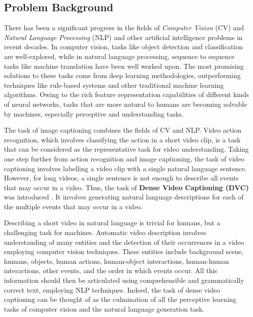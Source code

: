 \subsection{Problem Background}

\par There has been a significant progress in the fields of \textit{Computer Vision} (CV) and \textit{Natural Language Processing} (NLP) and other artificial intelligence problems in recent decades. In computer vision, tasks like object detection and classification are well-explored, while in natural language processing, sequence to sequence tasks like machine translation have been well worked upon. The most promising solutions to these tasks come from deep learning methodologies, outperforming techniques like rule-based systems and other traditional machine learning algorithms. Owing to the rich feature representation capabilities of different kinds of neural networks, tasks that are more natural to humans are becoming solvable by machines, especially perceptive and understanding tasks.

\par The task of image captioning combines the fields of CV and NLP. Video action recognition, which involves classifying the action in a short video clip, is a task that can be considered as the representative task for video understanding. Taking one step further from action recognition and image captioning, the task of video captioning involves labelling a video clip with a single natural language sentence. However, for long videos, a single sentence is not enough to describe all events that may occur in a video. Thus, the task of \textbf{Dense Video Captioning (DVC)} was introduced \cite{krishna2017densecaptioning}. It involves generating natural language descriptions for each of the multiple events that may occur in a video.

\par Describing a short video in natural language is trivial for humans, but a challenging task for machines. Automatic video description involves understanding of many entities and the detection of their occurrences in a video employing computer vision techniques. These entities include background scene, humans, objects, human actions, human-object interactions, human-human interactions, other events, and the order in which events occur. All this information should then be articulated using comprehensible and grammatically correct text, employing NLP techniques\cite{aafaq2020video}. Indeed, the task of dense video captioning can be thought of as the culmination of all the perceptive learning tasks of computer vision and the natural language generation task.

